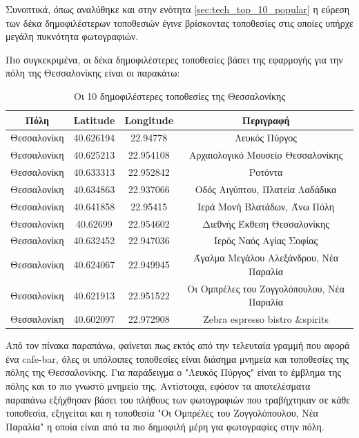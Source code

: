 \documentclass[oneside, 12pt]{book}
\begin{document}
Συνοπτικά, όπως αναλύθηκε και στην ενότητα \ref{sec:tech_top_10_popular} η εύρεση των δέκα δημοφιλέστερων τοποθεσιών έγινε βρίσκοντας τοποθεσίες στις οποίες υπήρχε μεγάλη πυκνότητα φωτογραφιών.

Πιο συγκεκριμένα, οι δέκα δημοφιλέστερες τοποθεσίες βάσει της εφαρμογής για την πόλη της Θεσσαλονίκης είναι οι παρακάτω:
\begin{table}[H]
\centering
    \begin{tabular}{|c|c|c|c|}
        \hline
        Πόλη & Latitude & Longitude & Περιγραφή \\
        \hline
        Θεσσαλονίκη & 40.626194 & 22.94778 & Λευκός Πύργος \\
        Θεσσαλονίκη & 40.625213 & 22.954108 & Αρχαιολογικό Μουσείο Θεσσαλονίκης \\
        Θεσσαλονίκη & 40.633313 & 22.952842 & Ροτόντα \\
        Θεσσαλονίκη & 40.634863 & 22.937066 & Οδός Αιγύπτου, Πλατεία Λαδάδικα \\
        Θεσσαλονίκη & 40.641858 & 22.95415 & Ιερά Μονή Βλατάδων, Άνω Πόλη \\
        Θεσσαλονίκη & 40.62699  & 22.954602 & Διεθνής Έκθεση Θεσσαλονίκης \\
        Θεσσαλονίκη & 40.632452 & 22.947036 & Ιερός Ναός Αγίας Σοφίας \\
        Θεσσαλονίκη & 40.624067 & 22.949945 & Άγαλμα Μεγάλου Αλεξάνδρου, Νέα Παραλία \\
        Θεσσαλονίκη & 40.621913 & 22.951522 & Οι Ομπρέλες του Ζογγολόπουλου, Νέα Παραλία \\
        Θεσσαλονίκη & 40.602097 & 22.972908 & Zebra espresso bistro \&spirits \\
        \hline
    \end{tabular}
    \caption{Οι 10 δημοφιλέστερες τοποθεσίες της Θεσσαλονίκης}
    \label{table:top_10_thessaloniki}
\end{table}

Από τον πίνακα παραπάνω, φαίνεται πως εκτός από την τελευταία 
γραμμή που αφορά ένα cafe-bar, όλες οι υπόλοιπες τοποθεσίες είναι 
διάσημα μνημεία και τοποθεσίες της πόλης της Θεσσαλονίκης.
Για παράδειγμα ο "Λευκός Πύργος" είναι το έμβλημα της πόλης και το πιο γνωστό μνημείο της. 
Αντίστοιχα, εφόσον τα αποτελέσματα παραπάνω εξήχθησαν βάσει του πλήθους των φωτογραφιών που τραβήχτηκαν σε κάθε τοποθεσία, εξηγείται και η τοποθεσία "Οι Ομπρέλες του Ζογγολόπουλου, Νέα Παραλία" η οποία είναι από τα πιο δημοφιλή μέρη για φωτογραφίες στην πόλη.
\end{document}
